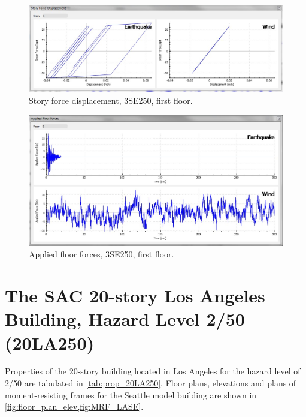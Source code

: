 \documentclass{simcenterdocumentation}
\begin{document}
\begin{figure}[H]
	\centering \includegraphics[scale=0.35]{3SE250_sfd.JPG}
	\caption{Story force displacement, 3SE250, first floor.}
\end{figure}
\begin{figure}[H]
	\centering \includegraphics[scale=0.35]{3SE250_aff.JPG}
	\caption{Applied floor forces, 3SE250, first floor.}
\end{figure}





\section{The SAC 20-story Los Angeles Building, Hazard Level 2/50 (20LA250)}
Properties of the 20-story building located in Los Angeles for the hazard level of 2/50 are tabulated in \cref{tab:prop_20LA250}. Floor plans, elevations and plans of moment-resisting frames for the Seattle model building are shown in \cref{fig:floor_plan_elev,fig:MRF_LASE}.
\end{document}
